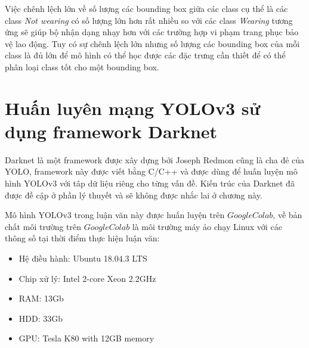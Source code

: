 Việc chênh lệch lớn về số lượng các bounding box giữa các class cụ thể là các class \emph{Not wearing} có số lượng lớn hơn rất nhiều so với các class \emph{Wearing} tương ứng sẽ giúp bộ nhận dạng nhạy hơn với các trường hợp vi phạm trang phục bảo vệ lao động. Tuy có sự chênh lệch lớn nhưng số lượng các bounding box của mỗi class là đủ lớn để mô hình có thể học được các đặc trưng cần thiết để có thể phân loại class tốt cho một bounding box.

\section{Huấn luyên mạng YOLOv3 sử dụng framework Darknet}
Darknet là một framework được xây dựng bởi Joseph Redmon cũng là cha đẻ của YOLO, framework này được viết bằng C/C++ và được dùng để huấn luyện mô hình YOLOv3 với tâp dữ liệu riêng cho từng vấn đề. Kiến trúc của Darknet đã được đề cập ở phần lý thuyết và sẽ không được nhắc lai ở chương này.

Mô hình YOLOv3 trong luận văn này được huấn luyện trên $Google Colab$, về bản chất môi trường trên $Google Colab$ là môi trường máy ảo chạy Linux với các thông số tại thời điểm thực hiện luận văn: 
\begin{itemize}
	\item Hệ điều hành: Ubuntu 18.04.3 LTS
	\item Chip xử lý: Intel 2-core Xeon 2.2GHz
	\item RAM: 13Gb
	\item HDD: 33Gb
	\item GPU: Tesla K80 with 12GB memory
\end{itemize}

